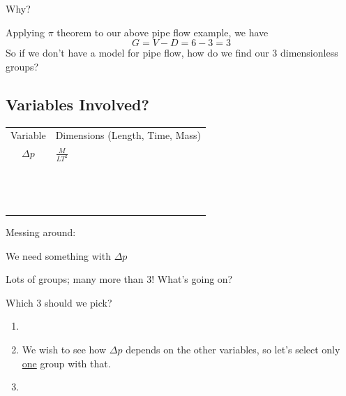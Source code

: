 \documentclass[paper=a4, fontsize=12pt]{scrartcl} %
\numberwithin{equation}{section} %
\numberwithin{figure}{section} %
\numberwithin{table}{section} %
\begin{document}
Why?

\newpage

\vspace{10ex} Applying $\pi$ theorem to our above pipe flow example, we have 
\begin{equation*}
G=V-D=6-3=\boxed{3}
\end{equation*}
So if we don't have a model for pipe flow, how do we find our 3 dimensionless groups?

\subsection*{Variables Involved?}

\begin{tabular}{ c || l  }
  Variable & Dimensions (Length, Time, Mass) \\
  $\Delta p$  & $\frac{M}{LT^2}$  \\
   &   \\
   &   \\
   &   \\
   &   \\
   &   \\
   &   \\
   &   \\
   &   \\
   &   \\
   &   \\
   &   \\
   &   \\
   &   \\
   &   \\
\end{tabular}


\vspace{5ex} Messing around:

\vspace{15ex}

We need something with $\Delta p$

\newpage

Lots of groups; many more than 3! What's going on?

\vspace{15ex}

Which 3 should we pick?
\begin{enumerate}
  \item
  \item \vspace{10ex} We wish to see how $\Delta p$ depends on the other variables, so let's select only \underline{one} group with that.
  \item \vspace{20ex}
\end{enumerate}
\end{document}
